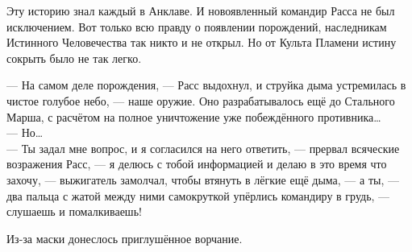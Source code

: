 Эту историю знал каждый в Анклаве. И новоявленный командир Расса не был 
исключением. Вот только всю правду о появлении порождений, наследникам Истинного 
Человечества так никто и не открыл. Но от Культа Пламени истину сокрыть было не 
так легко.

\noindent --- На самом деле порождения, --- Расс выдохнул, и струйка дыма 
устремилась в чистое голубое небо, --- наше оружие. Оно разрабатывалось ещё до 
Стального Марша, с расчётом на полное уничтожение уже побеждённого 
противника\ldots\\
--- Но\ldots\\
--- Ты задал мне вопрос, и я согласился на него ответить, --- прервал всяческие 
возражения Расс, --- я делюсь с тобой информацией и делаю в это время что 
захочу, --- выжигатель замолчал, чтобы втянуть в лёгкие ещё дыма, --- а ты, --- 
два пальца с жатой между ними самокруткой упёрлись командиру в грудь, --- 
слушаешь и помалкиваешь!

Из-за маски донеслось приглушённое ворчание.

